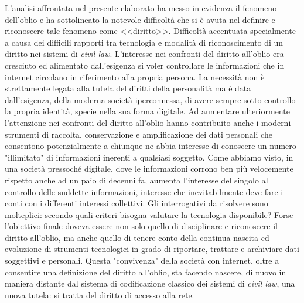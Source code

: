 L'analisi affrontata nel presente elaborato ha messo in evidenza il fenomeno dell'oblio e ha sottolineato la notevole difficoltà che si è avuta nel definire e riconoscere tale fenomeno come <<diritto>>.
Difficoltà accentuata specialmente a causa dei difficili rapporti tra tecnologia e modalità di riconoscimento di un diritto nei sistemi di \textit{civil law}.
L'interesse nei confronti del diritto all'oblio era cresciuto ed alimentato dall'esigenza si voler controllare le informazioni che in internet circolano in riferimento alla propria persona. La necessità non è strettamente legata alla tutela del diritti della personalità ma è data dall'esigenza, della moderna società iperconnessa, di avere sempre sotto controllo la propria identità, specie nella sua forma digitale.
Ad aumentare ulteriormente l'attenzione nei confronti del diritto all'oblio hanno contribuito anche i moderni strumenti di raccolta, conservazione e amplificazione dei dati personali che consentono potenzialmente a chiunque ne abbia interesse di conoscere un numero "illimitato" di informazioni inerenti a qualsiasi soggetto.
Come abbiamo visto, in una società pressoché digitale, dove le informazioni corrono ben più velocemente rispetto anche ad un paio di decenni fa, aumenta l'interesse del singolo al controllo delle suddette informazioni, interesse che inevitabilmente deve fare i conti con i differenti interessi collettivi.
Gli interrogativi da risolvere sono molteplici: secondo quali criteri bisogna valutare la tecnologia disponibile? Forse l'obiettivo finale doveva essere non solo quello di disciplinare e riconoscere il diritto all'oblio, ma anche quello di tenere conto della continua nascita ed evoluzione di strumenti tecnologici in grado di riportare, trattare e archiviare dati soggettivi e personali.
Questa "convivenza" della società con internet, oltre a consentire una definizione del diritto all'oblio, sta facendo nascere, di nuovo in maniera distante dal sistema di codificazione classico dei sistemi di \textit{civil law}, una nuova tutela: si tratta del diritto di accesso alla rete.

